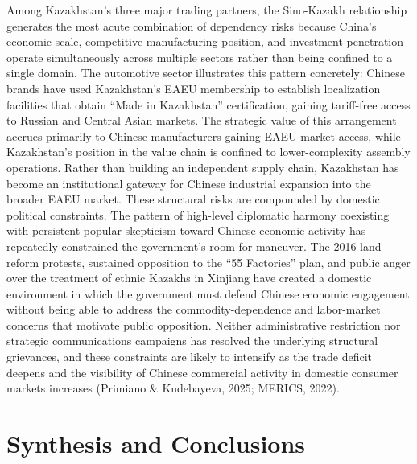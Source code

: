 \documentclass[12pt]{article}
\begin{document}
Among Kazakhstan's three major trading partners, the Sino-Kazakh relationship generates the most acute combination of dependency risks because China's economic scale, competitive manufacturing position, and investment penetration operate simultaneously across multiple sectors rather than being confined to a single domain. The automotive sector illustrates this pattern concretely: Chinese brands have used Kazakhstan's EAEU membership to establish localization facilities that obtain ``Made in Kazakhstan'' certification, gaining tariff-free access to Russian and Central Asian markets. The strategic value of this arrangement accrues primarily to Chinese manufacturers gaining EAEU market access, while Kazakhstan's position in the value chain is confined to lower-complexity assembly operations. Rather than building an independent supply chain, Kazakhstan has become an institutional gateway for Chinese industrial expansion into the broader EAEU market. These structural risks are compounded by domestic political constraints. The pattern of high-level diplomatic harmony coexisting with persistent popular skepticism toward Chinese economic activity has repeatedly constrained the government's room for maneuver. The 2016 land reform protests, sustained opposition to the ``55 Factories'' plan, and public anger over the treatment of ethnic Kazakhs in Xinjiang have created a domestic environment in which the government must defend Chinese economic engagement without being able to address the commodity-dependence and labor-market concerns that motivate public opposition. Neither administrative restriction nor strategic communications campaigns has resolved the underlying structural grievances, and these constraints are likely to intensify as the trade deficit deepens and the visibility of Chinese commercial activity in domestic consumer markets increases (Primiano \& Kudebayeva, 2025; MERICS, 2022).

\section{Synthesis and Conclusions}
\end{document}
